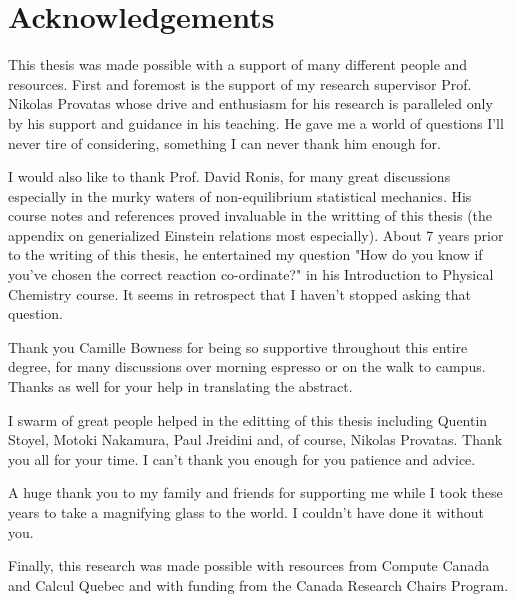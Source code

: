 \section*{Acknowledgements}
\label{sec:acknowledgements}

This thesis was made possible with a support of many different people and
resources. First and foremost is the support of my research supervisor Prof.
Nikolas Provatas whose drive and enthusiasm for his research is paralleled only
by his support and guidance in his teaching. He gave me a world of questions
I'll never tire of considering, something I can never thank him enough for.  

I would also like to thank Prof. David Ronis, for many great discussions
especially in the murky waters of non-equilibrium statistical mechanics.  His
course notes and references proved invaluable in the writting of this thesis
(the appendix on generialized Einstein relations most especially).  About 7
years prior to the writing of this thesis, he entertained my question "How do
you know if you've chosen the correct reaction co-ordinate?" in his
Introduction to Physical Chemistry course. It seems in retrospect that I
haven't stopped asking that question.

Thank you Camille Bowness for being so supportive throughout this entire
degree, for many discussions over morning espresso or on the walk to campus.
Thanks as well for your help in translating the abstract.

I swarm of great people helped in the editting of this thesis including Quentin
Stoyel, Motoki Nakamura, Paul Jreidini and, of course, Nikolas Provatas. Thank
you all for your time. I can't thank you enough for you patience and advice.

A huge thank you to my family and friends for supporting me while I took these
years to take a magnifying glass to the world. I couldn't have done it without
you.

Finally, this research was made possible with resources from Compute Canada and
Calcul Quebec and with funding from the Canada Research Chairs Program.

